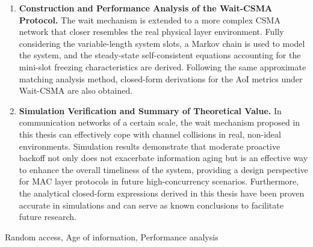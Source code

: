 \begin{abstractEN}
\begin{enumerate} [wide]
\item \textbf{Construction and Performance Analysis of the Wait-CSMA Protocol.} The wait mechanism is extended to a more complex CSMA network that closer resembles the real physical layer environment. Fully considering the variable-length system slots, a Markov chain is used to model the system, and the steady-state self-consistent equations accounting for the mini-slot freezing characteristics are derived. Following the same approximate matching analysis method, closed-form derivations for the AoI metrics under Wait-CSMA are also obtained.

\item \textbf{Simulation Verification and Summary of Theoretical Value.} In communication networks of a certain scale, the wait mechanism proposed in this thesis can effectively cope with channel collisions in real, non-ideal environments. Simulation results demonstrate that moderate proactive backoff not only does not exacerbate information aging but is an effective way to enhance the overall timeliness of the system, providing a design perspective for MAC layer protocols in future high-concurrency scenarios. Furthermore, the analytical closed-form expressions derived in this thesis have been proven accurate in simulations and can serve as known conclusions to facilitate future research.
\end{enumerate}

\end{abstractEN}

\begin{keywordEN}
Random access, Age of information, Performance analysis
\end{keywordEN}

